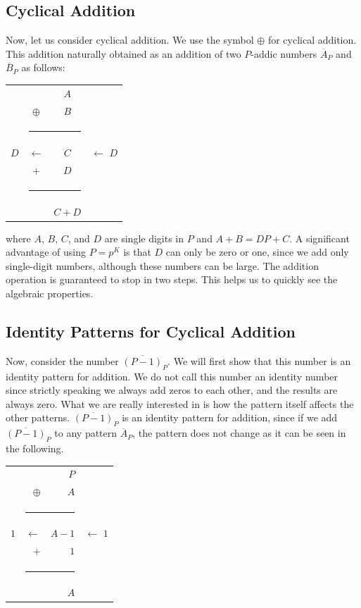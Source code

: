 \documentclass[times,twocolumn,final]{elsarticle}
\begin{document}
\subsection{Cyclical Addition}

Now, let us consider cyclical addition. We use the symbol $\oplus$ for cyclical addition. This addition naturally obtained as an addition of two $P$-addic numbers $\overline{A}_P$ and $\overline{B}_P$ as follows: 
\begin{table}[h]
\begin{tabular}{cccc}
&&$A$&  \\
&$\oplus$&$B$& \\ 
&\multicolumn{2}{c}{\rule{1.5cm}{0.5mm}}&\\
$D$ &$\leftarrow$  &$C$& $\leftarrow$ $D$ \\
&+&$D$& \\
&\multicolumn{2}{c}{\rule{1.5cm}{0.5mm}}&\\
&&$C+D$& \\
\end{tabular}
\end{table}
where $A$, $B$, $C$, and $D$ are single digits in $P$ and $A+B = D P + C$. A significant advantage of using $P=p^K$ is that $D$ can only be zero or one, since we add only single-digit numbers, although these numbers can be large. The addition operation is guaranteed to stop in two steps. This helps us to quickly see the algebraic properties. 

\subsection{Identity Patterns for Cyclical Addition}

Now, consider the number $\overline{(P-1)}_P$. We will first show that this number is an identity pattern for addition. We do not call this number an identity number since strictly speaking we always add zeros to each other, and the results are always zero.  What we are really interested in is how the pattern itself affects the other patterns. $\overline{(P-1)}_P$ is an identity pattern for addition, since if we add $\overline{(P-1)}_P$ to any pattern $\overline{A}_P$, the pattern does not change as it can be seen in the following. 
\begin{table}[h]
\begin{tabular}{crrc}
&&$P$&  \\
&$\oplus$&$A$& \\ 
&\multicolumn{2}{c}{\rule{1.5cm}{0.5mm}}&\\
$1$ &$\leftarrow$  &$A-1$& $\leftarrow$ $1$ \\
& + &$1$& \\
&\multicolumn{2}{c}{\rule{1.5cm}{0.5mm}}&\\
&&$A$& \\
\end{tabular}
\end{table}
\end{document}
